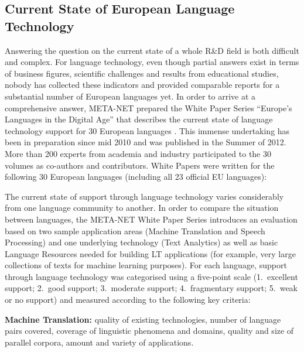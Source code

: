 \documentclass[10pt, plain]{../../metanetpaper}
\begin{document}
\begin{multicols}{2}

\subsection{Current State of European Language Technology}
\label{sec:what-current-state}

Answering the question on the current state of a whole R\&D field is both difficult and complex. For language technology, even though partial answers exist in terms of business figures, scientific challenges and results from educational studies, nobody has collected these indicators and provided comparable reports for a substantial number of European languages yet. In order to arrive at a comprehensive answer, META-NET prepared the White Paper Series ``Europe's Languages in the Digital Age'' that describes the current state of language technology support for 30 European languages \cite{LWP2012}. This immense undertaking has been in preparation since mid 2010 and was published in the Summer of 2012. More than 200 experts from academia and industry participated to the 30 volumes as co-authors and contributors. White Papers were written for the following 30 European languages (including all 23 official EU languages):

\medskip
\centerline{}

\medskip 
The current state of support through language technology varies considerably from one language community to another. In order to compare the situation between languages, the META-NET White Paper Series introduces an evaluation based on two sample application areas (Machine Translation and Speech Processing) and one underlying technology (Text Analytics) as well as basic Language Resources needed for building LT applications (for example, very large collections of texts for machine learning purposes). For each language, support through language technology was categorised using a five-point scale (1.~excellent support; 2.~good support; 3.~moderate support; 4.~fragmentary support; 5.~weak or no support) and measured according to the following key criteria:

\textbf{Machine Translation:} quality of existing technologies, number of language pairs covered, coverage of linguistic phenomena and domains, quality and size of parallel corpora, amount and variety of applications.


\end{multicols}
\end{document}
